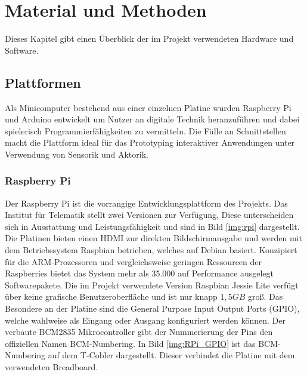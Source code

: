 \chapter{Material und Methoden}
\label{cha:config}

Dieses Kapitel gibt einen Überblick der im Projekt verwendeten Hardware und Software.


\section{Plattformen}

Als Minicomputer bestehend aus einer einzelnen Platine wurden Raspberry Pi und Arduino entwickelt um Nutzer an digitale Technik heranzuführen und dabei spielerisch Programmierfähigkeiten zu vermitteln. Die Fülle an Schnittstellen macht die Plattform ideal für das Prototyping interaktiver Anwendungen unter Verwendung von Sensorik und Aktorik. 

\subsection{Raspberry Pi}

Der Raspberry Pi ist die vorrangige Entwicklungsplattform des Projekts. Das Institut für Telematik stellt zwei Versionen zur Verfügung, Diese unterscheiden sich in Ausstattung und Leistungsfähigkeit und sind in Bild \ref{img:rpi} dargestellt. Die Platinen bieten einen HDMI zur direkten Bildschirmausgabe und werden mit dem Betriebssystem Raspbian betrieben, welches auf Debian basiert. Konzipiert für die ARM-Prozessoren und vergleichsweise geringen Ressourcen der Raspberries bietet das System mehr als 35.000 auf Performance ausgelegt Softwarepakete. Die im Projekt verwendete Version Raspbian Jessie Lite verfügt über keine grafische Benutzeroberfläche und ist nur knapp $1,5GB$ groß. Das Besondere an der Platine sind die General Purpose Input Output Ports (GPIO), welche wahlweise als Eingang oder Ausgang konfiguriert werden können. Der verbaute BCM2835 Mikrocontroller gibt der Nummerierung der Pins den offiziellen Namen BCM-Numbering. In Bild \ref{img:RPi_GPIO} ist das BCM-Numbering auf dem T-Cobler dargestellt. Dieser verbindet die Platine mit dem verwendeten Breadboard.

